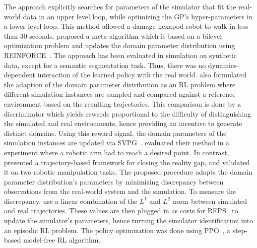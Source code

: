 \documentclass[utf8]{frontiersSCNS} %
\begin{document}
The approach explicitly searches for parameters of the simulator that fit the real-world data in an upper level loop, while optimizing the \ac{GP}'s hyper-parameters in a lower level loop.
This method allowed a damage hexapod robot to walk in less than 30 seconds.
%
\citet{Ruiz_Chandraker_19} proposed a meta-algorithm which is based on a bilevel optimization problem and updates the domain parameter distribution using REINFORCE~\citep{Williams_92}.
The approach has been evaluated in simulation on synthetic data, except for a semantic segmentation task.
Thus, there was no dynamics-dependent interaction of the learned policy with the real world. 
%
\citet{Mehta_Paull_19} also formulated the adaption of the domain parameter distribution as an \ac{RL} problem where different simulation instances are sampled and compared against a reference environment based on the resulting trajectories.
This comparison is done by a discriminator which yields rewards proportional to the difficulty of distinguishing the simulated and real environments, hence providing an incentive to generate distinct domains.
Using this reward signal, the domain parameters of the simulation instances are updated via \acl{SVPG}~\citep{Liu_etal_2017}.
\citet{Mehta_Paull_19} evaluated their method in a \simtoreal experiment where a robotic arm had to reach a desired point.
%
In contrast, \citet{Chebotar_Fox_19} presented a trajectory-based framework for closing the reality gap, and validated it on two \simtoreal robotic manipulation tasks.
The proposed procedure adapts the domain parameter distribution's parameters by minimizing discrepancy between observations from the real-world system and the simulation.
To measure the discrepancy, \citet{Chebotar_Fox_19} use a linear combination of the $L^1$ and $L^2$ norm between simulated and real trajectories.
These values are then plugged in as costs for \ac{REPS}~\citep{Peters_etal_2010} to update the simulator's parameters, hence turning the simulator identification into an episodic \ac{RL} problem.
The policy optimization was done using \ac{PPO}~\citep{Schulman_Klimov_17}, a step-based model-free \ac{RL} algorithm.

\end{document}
